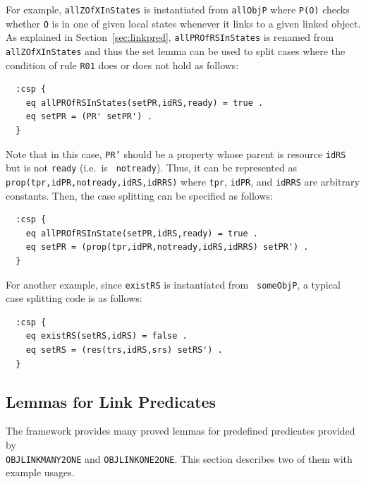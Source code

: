 \documentclass[12pt]{report}
\newcommand{\stt}[1]{{\small{\tt {#1}}}}
\begin{document}
For example, {\tt allZOfXInStates} is instantiated from {\tt allObjP}
where \stt{P(O)} checks whether {\tt O} is in one of given local
states whenever it links to a given linked object.  As explained in
Section~\ref{sec:linkpred}, {\tt allPROfRSInStates} is renamed
from {\tt allZOfXInStates} and thus the set lemma can be used to
split cases where the condition of rule {\tt R01} does or does not
hold as follows:
\begin{verbatim}
  :csp {
    eq allPROfRSInStates(setPR,idRS,ready) = true .
    eq setPR = (PR' setPR') .
  }
\end{verbatim}
Note that in this case, {\tt PR'} should be a property whose parent is
resource {\tt idRS} but is not {\tt ready} (i.e.\ is {\tt
  notready}). Thus, it can be represented as
\stt{prop(tpr,idPR,notready,idRS,idRRS)} where {\tt tpr}, {\tt idPR},
and {\tt idRRS} are arbitrary constants. Then, the case splitting
can be specified as follows:
\begin{verbatim}
  :csp {
    eq allPROfRSInState(setPR,idRS,ready) = true .
    eq setPR = (prop(tpr,idPR,notready,idRS,idRRS) setPR') .
  }
\end{verbatim}

For another example, since {\tt existRS} is instantiated from {\tt
  someObjP}, a typical case splitting code is as follows:
\begin{verbatim}
  :csp {
    eq existRS(setRS,idRS) = false .
    eq setRS = (res(trs,idRS,srs) setRS') .
  }
\end{verbatim}

\subsection{Lemmas for Link Predicates}
\label{sec:linklemma}
The framework provides many proved lemmas for predefined predicates
provided by\\ {\tt OBJLINKMANY2ONE} and {\tt OBJLINKONE2ONE}. This
section describes two of them with example usages.
\end{document}
